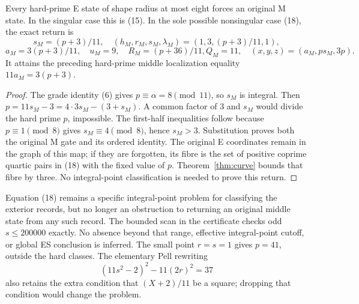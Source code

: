 \begin{corollary}
Every hard-prime E state of shape radius at most eight forces an original M
state. In the singular case this is (15). In the sole possible nonsingular
case (18), the exact return is
\[
 \boxed{s_M=(p+3)/11,\quad
 (h_M,r_M,s_M,\lambda_M)=(1,3,(p+3)/11,1),}
\]
\[
 \boxed{a_M=3(p+3)/11,\quad u_M=9,\quad R_M=(p+36)/11,
 Q_M=11,\quad (x,y,z)=(a_M,ps_M,3p).}                    \tag{18a}
\]
It attains the preceding hard-prime middle localization equality
$11a_M=3(p+3)$.
\end{corollary}
\begin{proof}
The grade identity (6) gives $p\equiv\alpha=8\pmod{11}$, so $s_M$ is integral.
Then $p=11s_M-3=4\cdot3s_M-(3+s_M)$. A common factor of $3$ and $s_M$
would divide the hard prime $p$, impossible. The first-half inequalities follow
because $p\equiv1\pmod8$ gives $s_M\equiv4\pmod8$, hence $s_M>3$.
Substitution proves both the original M gate and its ordered
identity. The original E coordinates remain in the graph of this map; if they
are forgotten, its fibre is the set of positive coprime quartic pairs in (18)
with the fixed value of $p$. Theorem~\ref{thm:curve} bounds that fibre by three.
No integral-point classification is needed to prove this return.
\end{proof}

Equation (18) remains a specific integral-point problem for classifying the
exterior records, but no longer an obstruction to returning an original middle
state from any such record. The bounded scan in the certificate checks
odd $s\le200000$ exactly. No absence beyond that range, effective integral-point
cutoff, or global ES conclusion is inferred. The small point $r=s=1$ gives
$p=41$, outside the hard classes. The elementary Pell rewriting
\[
 (11s^2-2)^2-11(2r)^2=37
\]
also retains the extra condition that $(X+2)/11$ be a square; dropping that
condition would change the problem.

